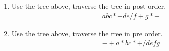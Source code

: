 \documentclass[a4papter]{article}
\begin{document}
\begin{enumerate}
\begin{enumerate}
 \item Use the tree above, traverse the tree in post order.
	 \begin{align*}
	 abc*+de/f+g*-
	 \end{align*}
 \item Use the tree above, traverse the tree in pre order.
	 \begin{align*}
		 -+a*bc*+/defg
	 \end{align*}
	\end{enumerate}
\end{enumerate}
\end{document}
